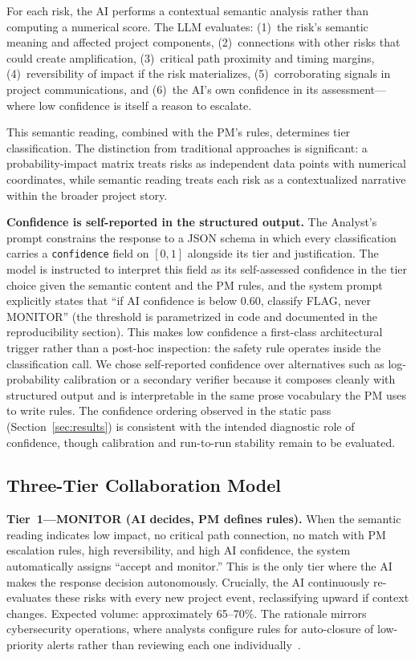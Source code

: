 \documentclass[runningheads]{llncs}
\begin{document}
For each risk, the AI performs a contextual semantic analysis rather than computing a numerical score. The LLM evaluates: (1)~the risk's semantic meaning and affected project components, (2)~connections with other risks that could create amplification, (3)~critical path proximity and timing margins, (4)~reversibility of impact if the risk materializes, (5)~corroborating signals in project communications, and (6)~the AI's own confidence in its assessment---where low confidence is itself a reason to escalate.

This semantic reading, combined with the PM's rules, determines tier classification. The distinction from traditional approaches is significant: a probability-impact matrix treats risks as independent data points with numerical coordinates, while semantic reading treats each risk as a contextualized narrative within the broader project story.

\textbf{Confidence is self-reported in the structured output.} The Analyst's prompt constrains the response to a JSON schema in which every classification carries a \texttt{confidence} field on $[0,1]$ alongside its tier and justification. The model is instructed to interpret this field as its self-assessed confidence in the tier choice given the semantic content and the PM rules, and the system prompt explicitly states that ``if AI confidence is below 0.60, classify FLAG, never MONITOR'' (the threshold is parametrized in code and documented in the reproducibility section). This makes low confidence a first-class architectural trigger rather than a post-hoc inspection: the safety rule operates inside the classification call. We chose self-reported confidence over alternatives such as log-probability calibration or a secondary verifier because it composes cleanly with structured output and is interpretable in the same prose vocabulary the PM uses to write rules. The confidence ordering observed in the static pass (Section~\ref{sec:results}) is consistent with the intended diagnostic role of confidence, though calibration and run-to-run stability remain to be evaluated.

\subsection{Three-Tier Collaboration Model}

\textbf{Tier~1---MONITOR (AI decides, PM defines rules).} When the semantic reading indicates low impact, no critical path connection, no match with PM escalation rules, high reversibility, and high AI confidence, the system automatically assigns ``accept and monitor.'' This is the only tier where the AI makes the response decision autonomously. Crucially, the AI continuously re-evaluates these risks with every new project event, reclassifying upward if context changes. Expected volume: approximately 65--70\%. The rationale mirrors cybersecurity operations, where analysts configure rules for auto-closure of low-priority alerts rather than reviewing each one individually~\cite{alertpriority2024}.
\end{document}
